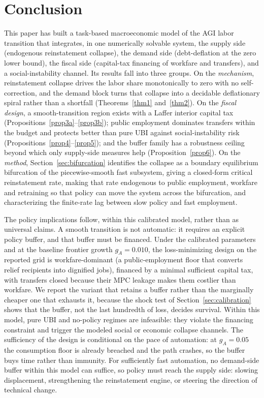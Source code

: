 \documentclass[review,12pt]{elsarticle}
\theoremstyle{plain}
\theoremstyle{definition}
\theoremstyle{remark}
\begin{document}
\section{Conclusion}
\label{sec:conclusion}
This paper has built a task-based macroeconomic model of the AGI labor transition that integrates, in one numerically solvable system, the supply side (endogenous reinstatement collapse), the demand side (debt-deflation at the zero lower bound), the fiscal side (capital-tax financing of workfare and transfers), and a social-instability channel. Its results fall into three groups. On the \emph{mechanism}, reinstatement collapse drives the labor share monotonically to zero with no self-correction, and the demand block turns that collapse into a decidable deflationary spiral rather than a shortfall (Theorems~\ref{thm1} and~\ref{thm2}). On the \emph{fiscal design}, a smooth-transition region exists with a Laffer interior capital tax (Propositions~\ref{prop3a}--\ref{prop3b}); public employment dominates transfers within the budget and protects better than pure UBI against social-instability risk (Propositions~\ref{prop4}--\ref{prop5}); and the buffer family has a robustness ceiling beyond which only supply-side measures help (Proposition~\ref{prop6}). On the \emph{method}, Section~\ref{sec:bifurcation} identifies the collapse as a boundary equilibrium bifurcation of the piecewise-smooth fast subsystem, giving a closed-form critical reinstatement rate, making that rate endogenous to public employment, workfare and retraining so that policy can move the system across the bifurcation, and characterizing the finite-rate lag between slow policy and fast employment.

The policy implications follow, within this calibrated model, rather than as universal claims. A smooth transition is not automatic: it requires an explicit policy buffer, and that buffer must be financed. Under the calibrated parameters and at the baseline frontier growth $g_A=0.010$, the loss-minimizing design on the reported grid is workfare-dominant (a public-employment floor that converts relief recipients into dignified jobs), financed by a minimal sufficient capital tax, with transfers closed because their MPC leakage makes them costlier than workfare. We report the variant that retains a buffer rather than the marginally cheaper one that exhausts it, because the shock test of Section~\ref{sec:calibration} shows that the buffer, not the last hundredth of loss, decides survival. Within this model, pure UBI and no-policy regimes are infeasible: they violate the financing constraint and trigger the modeled social or economic collapse channels. The sufficiency of the design is conditional on the pace of automation: at $g_A=0.05$ the consumption floor is already breached and the path crashes, so the buffer buys time rather than immunity. For sufficiently fast automation, no demand-side buffer within this model can suffice, so policy must reach the supply side: slowing displacement, strengthening the reinstatement engine, or steering the direction of technical change.
\end{document}
